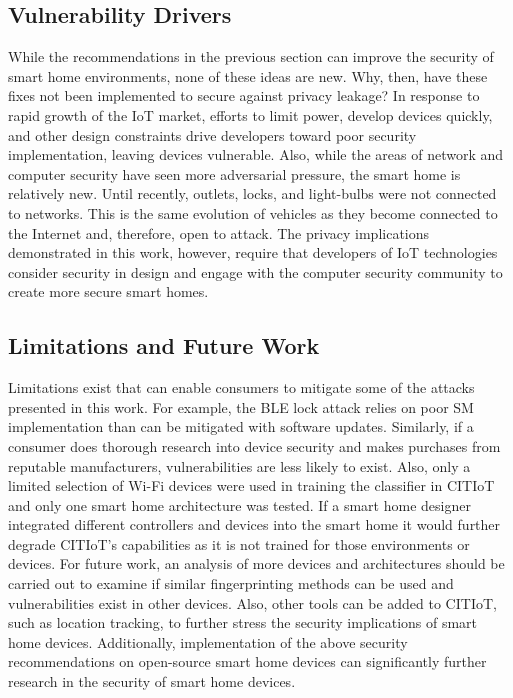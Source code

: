 \documentclass[conference]{./IEEEtran/IEEEtran}
\begin{document}
\subsection{Vulnerability Drivers}

While the recommendations in the previous section can improve the security of smart home environments, none of these ideas are new. Why, then, have these fixes not been implemented to secure against privacy leakage? In response to rapid growth of the \ac{IoT} market, efforts to limit power, develop devices quickly, and other design constraints drive developers toward poor security implementation, leaving devices vulnerable. Also, while the areas of network and computer security have seen more adversarial pressure, the smart home is relatively new. Until recently, outlets, locks, and light-bulbs were not connected to networks. This is the same evolution of vehicles as they become connected to the Internet and, therefore, open to attack. The privacy implications demonstrated in this work, however, require that developers of \ac{IoT} technologies consider security in design and engage with the computer security community to create more secure smart homes.

\subsection{Limitations and Future Work}

Limitations exist that can enable consumers to mitigate some of the attacks presented in this work. For example, the \ac{BLE} lock attack relies on poor \ac{SM} implementation than can be mitigated with software updates. Similarly, if a consumer does thorough research into device security and makes purchases from reputable manufacturers, vulnerabilities are less likely to exist. Also, only a limited selection of Wi-Fi devices were used in training the classifier in \ac{CITIoT} and only one smart home architecture was tested. If a smart home designer integrated different controllers and devices into the smart home it would further degrade CITIoT's capabilities as it is not trained for those environments or devices. For future work, an analysis of more devices and architectures should be carried out to examine if similar fingerprinting methods can be used and vulnerabilities exist in other devices. Also, other tools can be added to CITIoT, such as location tracking, to further stress the security implications of smart home devices. Additionally, implementation of the above security recommendations on open-source smart home devices can significantly further research in the security of smart home devices.
\end{document}
